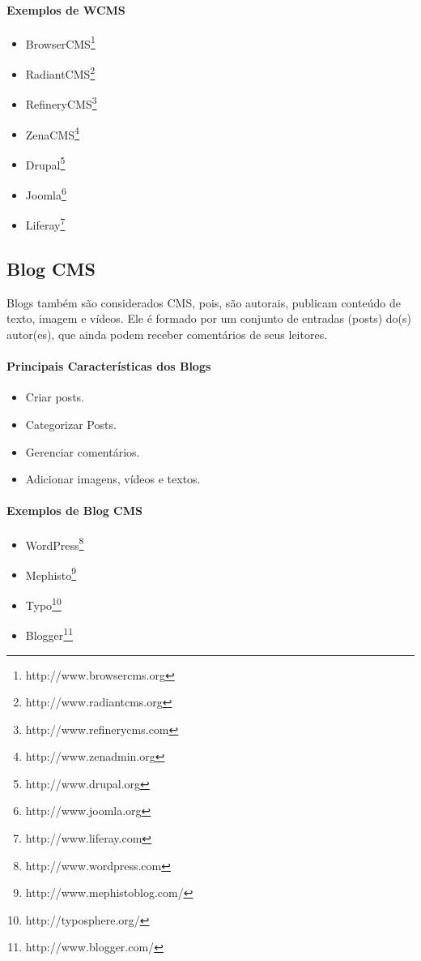 \paragraph{Exemplos de WCMS} 

\begin{itemize}
  \item BrowserCMS\footnote{http://www.browsercms.org}
  \item RadiantCMS\footnote{http://www.radiantcms.org}
  \item RefineryCMS\footnote{http://www.refinerycms.com}
  \item ZenaCMS\footnote{http://www.zenadmin.org}
  \item Drupal\footnote{http://www.drupal.org}
  \item Joomla\footnote{http://www.joomla.org}
  \item Liferay\footnote{http://www.liferay.com}
\end{itemize}  


\subsection{Blog CMS} 

Blogs também são considerados CMS, pois, são autorais, publicam conteúdo de texto, imagem e vídeos. Ele é formado por um conjunto de entradas (posts) do(s) autor(es), que ainda podem receber comentários de seus leitores.

\paragraph{Principais Características dos Blogs}

\begin{itemize}
  \item Criar posts.
  \item Categorizar Posts.
  \item Gerenciar comentários.
  \item Adicionar imagens, vídeos e textos.
\end{itemize}

\paragraph{Exemplos de Blog CMS} 

\begin{itemize}
  \item WordPress\footnote{http://www.wordpress.com}
  \item Mephisto\footnote{http://www.mephistoblog.com/}
  \item Typo\footnote{http://typosphere.org/}
  \item Blogger\footnote{http://www.blogger.com/}
\end{itemize}

